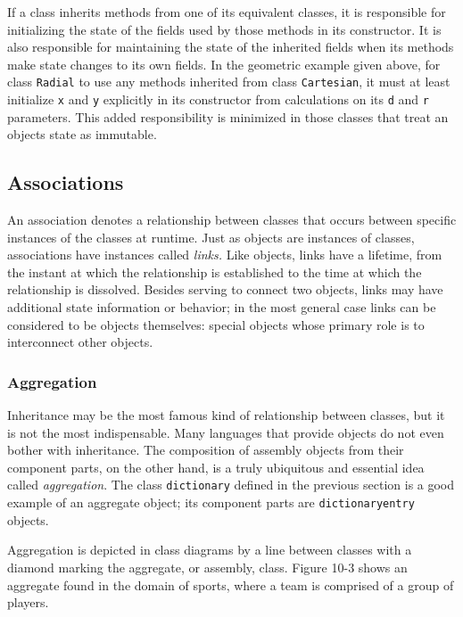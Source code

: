 If a class inherits methods from one of its equivalent classes, it
is responsible for initializing the state of the fields used by
those methods in its constructor. It is also responsible for
maintaining the state of the inherited fields when its methods make
state changes to its own fields. In the geometric example given above,
for class \texttt{Radial} to use any methods inherited from class
\texttt{Cartesian}, it must at least initialize \texttt{x} and
\texttt{y} explicitly in its constructor from calculations on its
\texttt{d} and \texttt{r} parameters. This added
responsibility is minimized in those classes that treat an
object{\textquotesingle}s state as immutable.

\subsection{Associations}

An association denotes a relationship between classes
that occurs between specific instances of the classes at runtime.
Just as objects are instances of classes, associations
have instances called \textit{links.}
Like objects, links have a lifetime, from the instant
at which the relationship is established to the time at which the
relationship is dissolved. Besides serving to connect two objects,
links may have additional state information or behavior; in the most
general case links can be considered to be objects themselves: special
objects whose primary role is to interconnect other objects.

\subsubsection{Aggregation}

Inheritance may be the most famous kind of relationship between classes,
but it is not the most indispensable. Many languages that provide
objects do not even bother with inheritance. The composition of
assembly objects from their component parts, on the other hand, is a
truly ubiquitous and essential idea called
\textit{aggregation}. The class \texttt{dictionary}
defined in the previous section is a good example of an aggregate
object; its component parts are \texttt{dictionaryentry} objects.

Aggregation is depicted in class diagrams by a line between classes with
a diamond marking the aggregate, or assembly, class. Figure 10-3
shows an aggregate found in the domain of sports, where a team is
comprised of a group of players.

